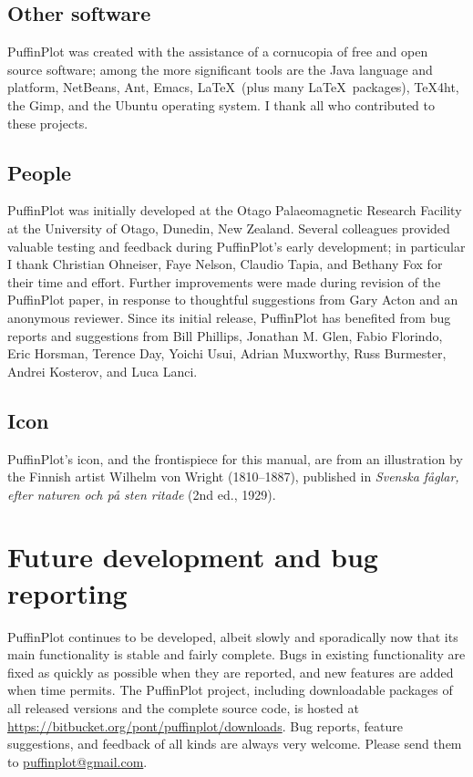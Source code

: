 \documentclass[a4paper,british]{article}
\begin{document}
\subsection*{Other software}

PuffinPlot was created with the assistance of a cornucopia of free and
open source software; among the more significant tools are the Java
language and platform, NetBeans, Ant, Emacs, \LaTeX\ (plus many
\LaTeX\ packages), TeX4ht, the Gimp, and the Ubuntu operating system. I
thank all who contributed to these projects.

\subsection*{People}

PuffinPlot was initially developed at the Otago Palaeomagnetic Research
Facility at the University of Otago, Dunedin, New Zealand. Several
colleagues provided valuable testing and feedback during PuffinPlot's
early development; in particular I thank Christian Ohneiser, Faye
Nelson, Claudio Tapia, and Bethany Fox for their time and effort.
Further improvements were made during revision of the PuffinPlot paper,
in response to thoughtful suggestions from Gary Acton and an anonymous
reviewer. Since its initial release, PuffinPlot has benefited from bug
reports and suggestions from Bill Phillips, Jonathan M. Glen, Fabio
Florindo, Eric Horsman, Terence Day, Yoichi Usui, Adrian Muxworthy,
Russ Burmester, Andrei Kosterov, and Luca Lanci.

\subsection*{Icon}

PuffinPlot's icon, and the frontispiece for this manual, are from an
illustration by the Finnish artist Wilhelm von Wright (1810--1887), published
in \emph{Svenska f\aa glar, efter naturen och p\aa{} sten ritade} (2nd ed.,
1929).


\section{Future development and bug reporting}

PuffinPlot continues to be developed, albeit slowly and sporadically now
that its main functionality is stable and fairly complete. Bugs in
existing functionality are fixed as quickly as possible when they are
reported, and new features are added when time permits. The PuffinPlot
project, including downloadable packages of all released versions and
the complete source code, is hosted at
\url{https://bitbucket.org/pont/puffinplot/downloads}. Bug reports,
feature suggestions, and feedback of all kinds are always very welcome.
Please send them to
\textsf{\href{mailto:puffinplot@gmail.com}{puffinplot@gmail.com}}.
\end{document}
